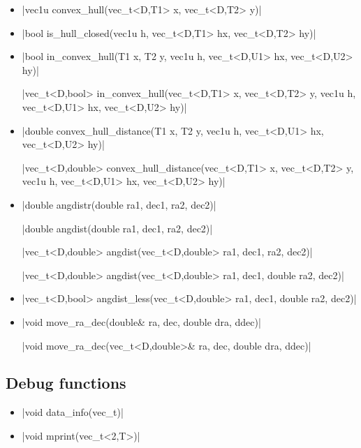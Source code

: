 \documentclass[12pt]{report}
\begin{document}
\begin{itemize}
\item \cppinline|vec1u convex_hull(vec_t<D,T1> x, vec_t<D,T2> y)| 

\item \cppinline|bool is_hull_closed(vec1u h, vec_t<D,T1> hx, vec_t<D,T2> hy)| 

\item \cppinline|bool in_convex_hull(T1 x, T2 y, vec1u h, vec_t<D,U1> hx, vec_t<D,U2> hy)| 

\cppinline|vec_t<D,bool> in_convex_hull(vec_t<D,T1> x, vec_t<D,T2> y, vec1u h, vec_t<D,U1> hx, vec_t<D,U2> hy)|

\item \cppinline|double convex_hull_distance(T1 x, T2 y, vec1u h, vec_t<D,U1> hx, vec_t<D,U2> hy)| 

\cppinline|vec_t<D,double> convex_hull_distance(vec_t<D,T1> x, vec_t<D,T2> y, vec1u h, vec_t<D,U1> hx, vec_t<D,U2> hy)|

\item \cppinline|double angdistr(double ra1, dec1, ra2, dec2)| 

\cppinline|double angdist(double ra1, dec1, ra2, dec2)| 

\cppinline|vec_t<D,double> angdist(vec_t<D,double> ra1, dec1, ra2, dec2)|

\cppinline|vec_t<D,double> angdist(vec_t<D,double> ra1, dec1, double ra2, dec2)|

\item \cppinline|vec_t<D,bool> angdist_less(vec_t<D,double> ra1, dec1, double ra2, dec2)| 

\item \cppinline|void move_ra_dec(double& ra, dec, double dra, ddec)| 

\cppinline|void move_ra_dec(vec_t<D,double>& ra, dec, double dra, ddec)|

\end{itemize}

\subsection{Debug functions}

\begin{itemize}
\item \cppinline|void data_info(vec_t)| 
\item \cppinline|void mprint(vec_t<2,T>)| 
\end{itemize}
\end{document}
